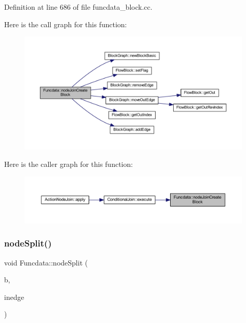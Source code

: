 Definition at line 686 of file funcdata\+\_\+block.\+cc.

Here is the call graph for this function\+:
\nopagebreak
\begin{figure}[H]
\begin{center}
\leavevmode
\includegraphics[width=350pt]{class_funcdata_ad810c24ce5fb16a95de1f7d27c8856d8_cgraph}
\end{center}
\end{figure}
Here is the caller graph for this function\+:
\nopagebreak
\begin{figure}[H]
\begin{center}
\leavevmode
\includegraphics[width=350pt]{class_funcdata_ad810c24ce5fb16a95de1f7d27c8856d8_icgraph}
\end{center}
\end{figure}
\mbox{\label{class_funcdata_a3e19baf8aa1db2ecde4fd12075da0694}} 
\subsubsection{\texorpdfstring{nodeSplit()}{nodeSplit()}}
{\footnotesize\ttfamily void Funcdata\+::node\+Split (\begin{DoxyParamCaption}\item[{\mbox{\hyperlink{class_block_basic}{Block\+Basic}} $\ast$}]{b,  }\item[{int4}]{inedge }\end{DoxyParamCaption})}



